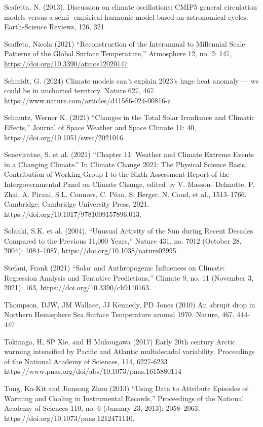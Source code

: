 \documentclass[12pt,paper=a4,DIV=12,parskip=never,chapterprefix=false,headings=standardclasses]{scrreprt}
\begin{document}
Scafetta, N. (2013). Discussion on climate oscillations: CMIP5 general circulation models versus a semi-
empirical harmonic model based on astronomical cycles. Earth-Science Reviews, 126, 321

Scaffeta, Nicola (2021) “Reconstruction of the Interannual to Millennial Scale Patterns of the Global
Surface Temperature,” Atmosphere 12, no. 2: 147, \url{https://doi.org/10.3390/atmos12020147}

Schmidt, G. (2024) Climate models can’t explain 2023’s huge heat anomaly — we could be in uncharted
territory. Nature 627, 467. https://www.nature.com/articles/d41586-024-00816-z

Schmutz, Werner K. (2021) “Changes in the Total Solar Irradiance and Climatic Effects,” Journal of
Space Weather and Space Climate 11: 40, https://doi.org/10.1051/swsc/2021016.

Seneviratne, S. et al. (2021) “Chapter 11: Weather and Climate Extreme Events in a Changing Climate.”
In Climate Change 2021: The Physical Science Basis. Contribution of Working Group I to the Sixth
Assessment Report of the Intergovernmental Panel on Climate Change, edited by V. Masson-
Delmotte, P. Zhai, A. Pirani, S.L. Connors, C. Péan, S. Berger, N. Caud, et al., 1513–1766.
Cambridge: Cambridge University Press, 2021. https://doi.org/10.1017/9781009157896.013.

Solanki, S.K. et al. (2004), “Unusual Activity of the Sun during Recent Decades Compared to the
Previous 11,000 Years,” Nature 431, no. 7012 (October 28, 2004): 1084–1087,
https://doi.org/10.1038/nature02995.

Stefani, Frank (2021) “Solar and Anthropogenic Influences on Climate: Regression Analysis and
Tentative Predictions,” Climate 9, no. 11 (November 3, 2021): 163,
https://doi.org/10.3390/cli9110163.

Thompson, DJW, JM Wallace, JJ Kennedy, PD Jones (2010) An abrupt drop in Northern Hemisphere Sea
Surface Temperature around 1970. Nature, 467, 444-447

Tokinaga, H, SP Xie, and H Mukougawa (2017) Early 20th century Arctic warming intensified by
Pacific and Atlantic multidecadal variability. Proceedings of the National Academy of Sciences, 114,
6227-6233 https://www.pnas.org/doi/abs/10.1073/pnas.1615880114

Tung, Ka-Kit and Jiansong Zhou (2013) “Using Data to Attribute Episodes of Warming and Cooling in
Instrumental Records,” Proceedings of the National Academy of Sciences 110, no. 6 (January 23,
2013): 2058–2063, https://doi.org/10.1073/pnas.1212471110.
\end{document}
